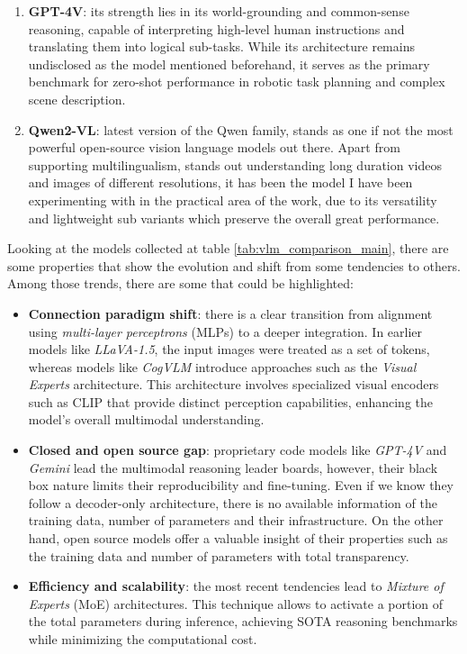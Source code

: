 \begin{enumerate}
	\item \textbf{GPT-4V}: its strength lies in its world-grounding and common-sense reasoning, capable of interpreting high-level human instructions and translating them into logical sub-tasks. While its architecture remains undisclosed as the model mentioned beforehand, it serves as the primary benchmark for zero-shot performance in robotic task planning and complex scene description.
	
	\item \textbf{Qwen2-VL}: latest version of the Qwen family, stands as one if not the most powerful open-source vision language models out there. Apart from supporting multilingualism, stands out understanding long duration videos and images of different resolutions, it has been the model I have been experimenting with in the practical area of the work, due to its versatility and lightweight sub variants which preserve the overall great performance.
\end{enumerate}

Looking at the models collected at table \ref{tab:vlm_comparison_main}, there are some properties that show the evolution and shift from some tendencies to others. Among those trends, there are some that could be highlighted:

\begin{itemize}
	\item \textbf{Connection paradigm shift}: there is a clear transition from alignment using \textit{multi-layer perceptrons} (MLPs) to a deeper integration. In earlier models like \textit{LLaVA-1.5}, the input images were treated as a set of tokens, whereas models like \textit{CogVLM} introduce approaches such as the 	\textit{Visual Experts} architecture. This architecture involves specialized visual encoders such as CLIP that provide distinct perception capabilities, enhancing the model's overall multimodal understanding. 
	
	\item \textbf{Closed and open source gap}: proprietary code models like \textit{GPT-4V} and \textit{Gemini} lead the multimodal reasoning leader boards, however, their black box nature limits their reproducibility and fine-tuning. Even if we know they follow a decoder-only architecture, there is no available information of the training data, number of parameters and their infrastructure. On the other hand, open source models offer a valuable insight of their properties such as the training data and number of parameters with total transparency. 
	
	\item \textbf{Efficiency and scalability}: the most recent tendencies lead to \textit{Mixture of Experts} (MoE) architectures. This technique allows to activate a portion of the total parameters during inference, achieving SOTA reasoning benchmarks while minimizing the computational cost. 
\end{itemize}

